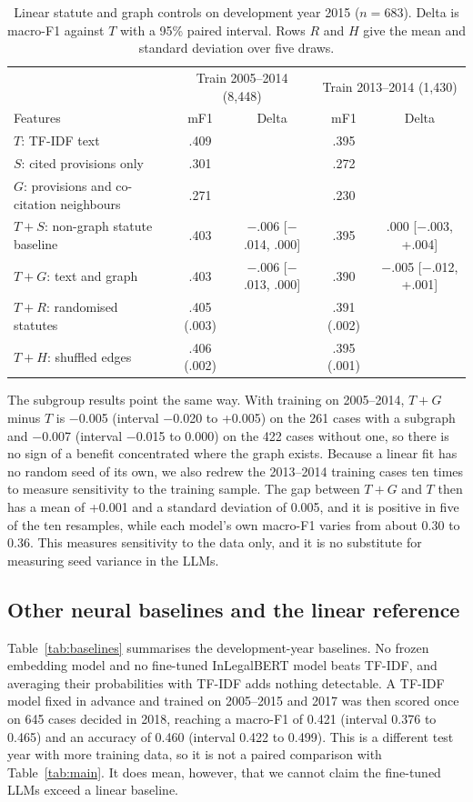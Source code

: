 \documentclass[11pt,a4paper]{article}
\begin{document}
\begin{table}[t]\centering\small
\setlength{\tabcolsep}{4pt}
\caption{Linear statute and graph controls on development year 2015 ($n=683$). Delta is macro-F1 against $T$ with a 95\% paired interval. Rows $R$ and $H$ give the mean and standard deviation over five draws.}\label{tab:controls}
\begin{tabular}{@{}lcccc@{}}\toprule
& \multicolumn{2}{c}{Train 2005--2014 (8,448)} & \multicolumn{2}{c}{Train 2013--2014 (1,430)}\\
Features & mF1 & Delta & mF1 & Delta\\\midrule
$T$: TF-IDF text & .409 & & .395 & \\
$S$: cited provisions only & .301 & & .272 & \\
$G$: provisions and co-citation neighbours & .271 & & .230 & \\
$T{+}S$: non-graph statute baseline & .403 & $-$.006 [$-$.014, .000] & .395 & .000 [$-$.003, +.004]\\
$T{+}G$: text and graph & .403 & $-$.006 [$-$.013, .000] & .390 & $-$.005 [$-$.012, +.001]\\
$T{+}R$: randomised statutes & .405 (.003) & & .391 (.002) & \\
$T{+}H$: shuffled edges & .406 (.002) & & .395 (.001) & \\\bottomrule
\end{tabular}\end{table}

The subgroup results point the same way. With training on 2005--2014, $T{+}G$ minus $T$ is $-$0.005 (interval $-$0.020 to +0.005) on the 261 cases with a subgraph and $-$0.007 (interval $-$0.015 to 0.000) on the 422 cases without one, so there is no sign of a benefit concentrated where the graph exists. Because a linear fit has no random seed of its own, we also redrew the 2013--2014 training cases ten times to measure sensitivity to the training sample. The gap between $T{+}G$ and $T$ then has a mean of +0.001 and a standard deviation of 0.005, and it is positive in five of the ten resamples, while each model's own macro-F1 varies from about 0.30 to 0.36. This measures sensitivity to the data only, and it is no substitute for measuring seed variance in the LLMs.

\subsection{Other neural baselines and the linear reference}
Table~\ref{tab:baselines} summarises the development-year baselines. No frozen embedding model and no fine-tuned InLegalBERT model beats TF-IDF, and averaging their probabilities with TF-IDF adds nothing detectable. A TF-IDF model fixed in advance and trained on 2005--2015 and 2017 was then scored once on 645 cases decided in 2018, reaching a macro-F1 of 0.421 (interval 0.376 to 0.465) and an accuracy of 0.460 (interval 0.422 to 0.499). This is a different test year with more training data, so it is not a paired comparison with Table~\ref{tab:main}. It does mean, however, that we cannot claim the fine-tuned LLMs exceed a linear baseline.
\end{document}
